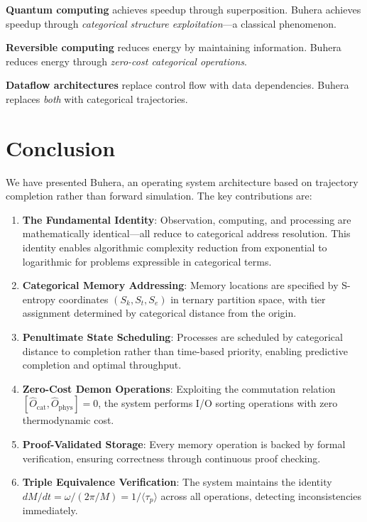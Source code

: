 \documentclass[twocolumn,10pt]{article}
\theoremstyle{definition}
\theoremstyle{remark}
\begin{document}
\textbf{Quantum computing} \citep{nielsen2010} achieves speedup through superposition. Buhera achieves speedup through \emph{categorical structure exploitation}—a classical phenomenon.

\textbf{Reversible computing} \citep{bennett1973} reduces energy by maintaining information. Buhera reduces energy through \emph{zero-cost categorical operations}.

\textbf{Dataflow architectures} \citep{dennis1980dataflow} replace control flow with data dependencies. Buhera replaces \emph{both} with categorical trajectories.

\section{Conclusion}
\label{sec:conclusion}

We have presented Buhera, an operating system architecture based on trajectory completion rather than forward simulation. The key contributions are:

\begin{enumerate}
    \item \textbf{The Fundamental Identity}: Observation, computing, and processing are mathematically identical—all reduce to categorical address resolution. This identity enables algorithmic complexity reduction from exponential to logarithmic for problems expressible in categorical terms.

    \item \textbf{Categorical Memory Addressing}: Memory locations are specified by S-entropy coordinates $(S_k, S_t, S_e)$ in ternary partition space, with tier assignment determined by categorical distance from the origin.

    \item \textbf{Penultimate State Scheduling}: Processes are scheduled by categorical distance to completion rather than time-based priority, enabling predictive completion and optimal throughput.

    \item \textbf{Zero-Cost Demon Operations}: Exploiting the commutation relation $[\hat{O}_{\text{cat}}, \hat{O}_{\text{phys}}] = 0$, the system performs I/O sorting operations with zero thermodynamic cost.

    \item \textbf{Proof-Validated Storage}: Every memory operation is backed by formal verification, ensuring correctness through continuous proof checking.

    \item \textbf{Triple Equivalence Verification}: The system maintains the identity $dM/dt = \omega/(2\pi/M) = 1/\langle\tau_p\rangle$ across all operations, detecting inconsistencies immediately.
\end{enumerate}
\end{document}
